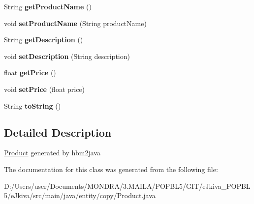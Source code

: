 \begin{DoxyCompactItemize}
\mbox{\label{classentity_1_1copy_1_1_product_a8644d8829d4254346993bdc7b4c7a8ba}} 
String {\bfseries get\+Product\+Name} ()
\item 
\mbox{\label{classentity_1_1copy_1_1_product_a9a47aa091bbd8d534810fffb1407ccd8}} 
void {\bfseries set\+Product\+Name} (String product\+Name)
\item 
\mbox{\label{classentity_1_1copy_1_1_product_a43b93cfcc32200cb7a1cce47e90117f6}} 
String {\bfseries get\+Description} ()
\item 
\mbox{\label{classentity_1_1copy_1_1_product_a701999a3460085d6e71fcd163a24dc2b}} 
void {\bfseries set\+Description} (String description)
\item 
\mbox{\label{classentity_1_1copy_1_1_product_aea3fb9d5f363805dd3a437454a437135}} 
float {\bfseries get\+Price} ()
\item 
\mbox{\label{classentity_1_1copy_1_1_product_a7dffc059d4324b75eed57b54a00a2856}} 
void {\bfseries set\+Price} (float price)
\item 
\mbox{\label{classentity_1_1copy_1_1_product_a346da789eabee1b788186e1170469dd5}} 
String {\bfseries to\+String} ()
\end{DoxyCompactItemize}


\subsection{Detailed Description}
\mbox{\hyperlink{classentity_1_1copy_1_1_product}{Product}} generated by hbm2java 

The documentation for this class was generated from the following file\+:\begin{DoxyCompactItemize}
\item 
D\+:/\+Users/user/\+Documents/\+M\+O\+N\+D\+R\+A/3.\+M\+A\+I\+L\+A/\+P\+O\+P\+B\+L5/\+G\+I\+T/e\+Jkiva\+\_\+\+P\+O\+P\+B\+L5/e\+Jkiva/src/main/java/entity/copy/Product.\+java\end{DoxyCompactItemize}
